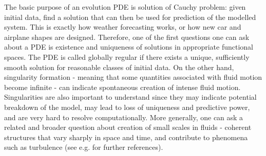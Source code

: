 \documentclass[reqno,centertags, 11pt]{amsart}
\begin{document}
The basic purpose of an evolution PDE is solution of Cauchy problem: given initial data, find a solution that can then be used for prediction
of the modelled system. This is exactly how weather forecasting works, or how new car and airplane shapes are designed.
Therefore, one of the first questions one can ask about a PDE is existence and uniqueness of solutions in appropriate
functional spaces. The PDE is called globally regular if there exists a unique, sufficiently smooth solution for reasonable classes of initial data.
On the other hand, singularity formation - meaning that some quantities associated with fluid motion become infinite - can indicate spontaneous
creation of intense fluid motion. Singularities are also important to understand since they may indicate
potential breakdown of the model, may lead to loss of uniqueness and predictive power, and are very hard to resolve computationally.
More generally, one can ask a related and broader question about creation of small scales in fluids - coherent structures that vary sharply in space and time,
and contribute to phenomena such as turbulence (see e.g. \cite{Eyink} for further references).
\end{document}
